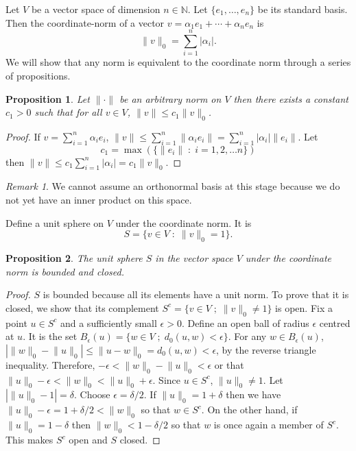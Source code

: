 \documentclass{article}
\theoremstyle{plain}
\numberwithin{thm}{section}
\theoremstyle{plain}
\newtheorem{prop}{Proposition}
\numberwithin{prop}{section}
\theoremstyle{definition}
\numberwithin{defn}{section}
\theoremstyle{remark}
\newtheorem*{rem}{Remark}
\numberwithin{equation}{section}
\begin{document}
Let $V$ be a vector space of dimension $n \in \mathbb{N}$. Let $\{e_1, \ldots,
e_n\}$ be its standard basis. Then the coordinate-norm of a vector $v = 
\alpha_1e_1 + \cdots + \alpha_ne_n$ is 
\[
\lVert v \rVert_0 = \sum_{i=1}^n|\alpha_i|.
\]
We will show that any norm is equivalent to the coordinate norm through a
series of propositions.
\begin{prop}\label{s2p4}
Let $\lVert\cdot\rVert$ be an arbitrary norm on $V$ then there exists a constant
$c_1 > 0$ such that for all $v \in V$, $\lVert v \rVert \le c_1\lVert v \rVert_0
$.
\end{prop}
\begin{proof}
If $v = \sum_{i=1}^n \alpha_i e_i$, $\lVert v \rVert \le \sum_{i=1}^n\lVert 
\alpha_i e_i\rVert = \sum_{i=1}^n|\alpha_i|\lVert e_i \rVert$. Let 
\[
c_1 = \max(\{\lVert e_i \rVert\;:\; i = 1, 2, \ldots n\})
\]
then $\lVert v \rVert \le c_1\sum_{i=1}^n|\alpha_i| = c_1\lVert v \rVert_0$.
\end{proof}
\begin{rem}
We cannot assume an orthonormal basis at this stage because we do not yet have
an inner product on this space.
\end{rem}

Define a unit sphere on $V$ under the coordinate norm. It is
\[
S = \{v \in V \;:\; \lVert v \rVert_0 = 1\}.
\]

\begin{prop}\label{s2p5}
The unit sphere $S$ in the vector space $V$ under the coordinate norm is 
bounded and closed.
\end{prop}
\begin{proof}
$S$ is bounded because all its elements have a unit norm. To prove that it is
closed, we show that its complement $S^c = \{v \in V \;;\; \lVert v \rVert_0
\ne 1\}$ is open. Fix a point $u \in S^c$ and a sufficiently small $\epsilon >
0$. Define an open ball of radius $\epsilon$ centred at $u$. It is the set 
$B_\epsilon(u) = \{w \in V \;;\; d_0(u, w) < \epsilon\}$. For any $w \in 
B_\epsilon(u)$, $|\lVert w \rVert_0 - \lVert u \rVert_0| \le \lVert u - 
w\rVert_0 = d_0(u, w) < \epsilon$, by the reverse triangle inequality. 
Therefore, $-\epsilon < \lVert w \rVert_0 - \lVert u \rVert_0 < \epsilon$ or 
that $\lVert u \rVert_0 - \epsilon < \lVert w \rVert_0 < \lVert u \rVert_0 + 
\epsilon$. Since $u \in S^c$, $\lVert u \rVert_0 \ne 1$. Let $|\lVert u 
\rVert_0 - 1| = \delta$. Choose $\epsilon = \delta/2$. If $\lVert u \rVert_0 =
1 + \delta$ then we have $\lVert u \rVert_0 - \epsilon = 1 + \delta/2 < \lVert
w \rVert_0$ so that $w \in S^c$. On the other hand, if $\lVert u \rVert_0 = 1 
- \delta$ then $\lVert w \rVert_0 < 1 - \delta/2$ so that $w$ is once again
a member of $S^c$. This makes $S^c$ open and $S$ closed.
\end{proof}
\end{document}
